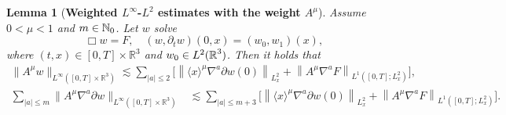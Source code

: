 \documentclass[11pt,twoside]{article}
\def\N{\mathop{\mathbb N\kern 0pt}\nolimits}
\def\R{\mathop{\mathbb R\kern 0pt}\nolimits}
\def\ls{\lesssim}
\theoremstyle{plain}
\newtheorem{lemma}[theorem]{Lemma}
\theoremstyle{definition}
\theoremstyle{assumption}
\numberwithin{equation}{section}
\begin{document}
			
			\begin{lemma}[{\bf Weighted \(L^\infty\)-\(L^2\) estimates with the weight $A^\mu$}]
				\label{lem:weak-weighted-Linfty-L2}
				Assume \(0<\mu<1\) and $m\in\N_0$. Let \(w\) solve
				\begin{equation*}
					\Box w=F,\quad
					(w,\partial_t w)(0,x)=(w_0,w_1)(x),
				\end{equation*}
				where $(t,x)\in [0,T]\times\mathbb R^3$ and $w_0\in L^2(\R^3)$.
				Then it holds that
				\begin{equation}
					\label{eq:weak-weighted-Linfty-L2-w}
					\begin{aligned}
						\|A^\mu w\|_{L^\infty([0,T]\times\mathbb R^3)}
						\ls
						\sum_{|a|\le2}
						\big[
						\left\|
						\langle x\rangle^\mu\nabla^a \partial w(0)
						\right\|_{L^2_x}
						+
						\left\|
						A^\mu\nabla^aF
						\right\|_{L^1([0,T];L^2_x)}
						\big],
					\end{aligned}
				\end{equation}
				\begin{equation}
					\label{eq:weak-weighted-Linfty-L2-dw}
					\begin{aligned}
						\sum_{|a|\le m}
						\|A^\mu\nabla^a\partial w\|_{L^\infty([0,T]\times\mathbb R^3)}
						&\ls
						\sum_{|a|\le m+3}
						\big[
						\left\|
						\langle x\rangle^\mu
						\nabla^a\partial w(0)
						\right\|_{L^2_x}
						+
						\left\|
						A^\mu\nabla^aF
						\right\|_{L^1([0,T];L^2_x)}
						\big].
					\end{aligned}
				\end{equation}
			\end{lemma}
			
\end{document}
